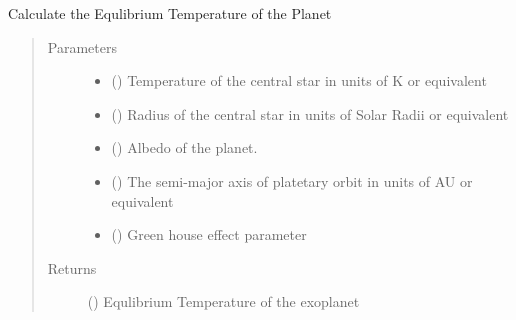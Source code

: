 \documentclass[a4paper,11pt,english]{sphinxmanual}
\begin{document}
\begin{fulllineitems}
\label{\detokenize{cascade.exoplanet_tools:cascade.exoplanet_tools.exoplanet_tools.EquilibriumTemperature}}
Calculate the Equlibrium Temperature of the Planet
\begin{quote}\begin{description}
\item[{Parameters}] \leavevmode\begin{itemize}
\item {} 
 () \textendash{} Temperature of the central star in units of K or equivalent

\item {} 
 () \textendash{} Radius of the central star in units of Solar Radii or equivalent

\item {} 
 () \textendash{} Albedo of the planet.

\item {} 
 () \textendash{} The semi-major axis of platetary orbit in units of AU or equivalent

\item {} 
 () \textendash{} Green house effect parameter

\end{itemize}

\item[{Returns}] \leavevmode
{} () \textendash{} Equlibrium Temperature of the exoplanet

\end{description}\end{quote}

\end{fulllineitems}
\end{document}

